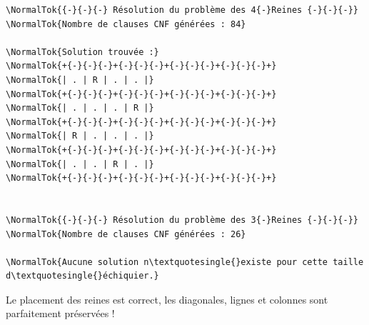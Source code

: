 \documentclass[11pt,a4paper]{article}
\begin{document}
\begin{lstlisting}
\NormalTok{{-}{-}{-} Résolution du problème des 4{-}Reines {-}{-}{-}}
\NormalTok{Nombre de clauses CNF générées : 84}

\NormalTok{Solution trouvée :}
\NormalTok{+{-}{-}{-}+{-}{-}{-}+{-}{-}{-}+{-}{-}{-}+}
\NormalTok{| . | R | . | . |}
\NormalTok{+{-}{-}{-}+{-}{-}{-}+{-}{-}{-}+{-}{-}{-}+}
\NormalTok{| . | . | . | R |}
\NormalTok{+{-}{-}{-}+{-}{-}{-}+{-}{-}{-}+{-}{-}{-}+}
\NormalTok{| R | . | . | . |}
\NormalTok{+{-}{-}{-}+{-}{-}{-}+{-}{-}{-}+{-}{-}{-}+}
\NormalTok{| . | . | R | . |}
\NormalTok{+{-}{-}{-}+{-}{-}{-}+{-}{-}{-}+{-}{-}{-}+}


\NormalTok{{-}{-}{-} Résolution du problème des 3{-}Reines {-}{-}{-}}
\NormalTok{Nombre de clauses CNF générées : 26}

\NormalTok{Aucune solution n\textquotesingle{}existe pour cette taille d\textquotesingle{}échiquier.}
\end{lstlisting}

Le placement des reines est correct, les diagonales, lignes et colonnes
sont parfaitement préservées !
\n
\end{document}
